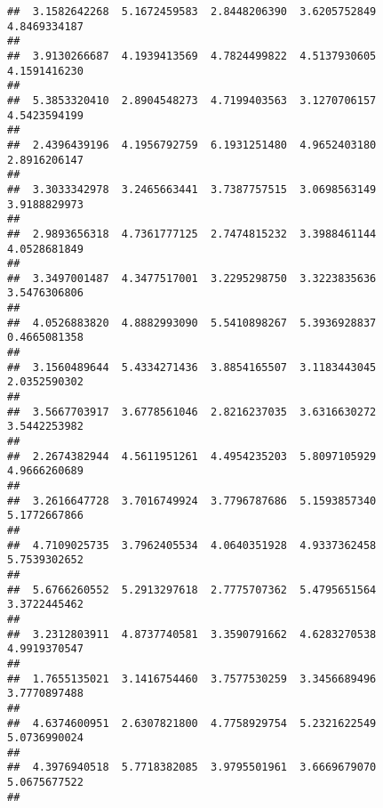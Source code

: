 \documentclass[]{article}
\begin{document}
\begin{verbatim}
##  3.1582642268  5.1672459583  2.8448206390  3.6205752849  4.8469334187 
##                                                                       
##  3.9130266687  4.1939413569  4.7824499822  4.5137930605  4.1591416230 
##                                                                       
##  5.3853320410  2.8904548273  4.7199403563  3.1270706157  4.5423594199 
##                                                                       
##  2.4396439196  4.1956792759  6.1931251480  4.9652403180  2.8916206147 
##                                                                       
##  3.3033342978  3.2465663441  3.7387757515  3.0698563149  3.9188829973 
##                                                                       
##  2.9893656318  4.7361777125  2.7474815232  3.3988461144  4.0528681849 
##                                                                       
##  3.3497001487  4.3477517001  3.2295298750  3.3223835636  3.5476306806 
##                                                                       
##  4.0526883820  4.8882993090  5.5410898267  5.3936928837  0.4665081358 
##                                                                       
##  3.1560489644  5.4334271436  3.8854165507  3.1183443045  2.0352590302 
##                                                                       
##  3.5667703917  3.6778561046  2.8216237035  3.6316630272  3.5442253982 
##                                                                       
##  2.2674382944  4.5611951261  4.4954235203  5.8097105929  4.9666260689 
##                                                                       
##  3.2616647728  3.7016749924  3.7796787686  5.1593857340  5.1772667866 
##                                                                       
##  4.7109025735  3.7962405534  4.0640351928  4.9337362458  5.7539302652 
##                                                                       
##  5.6766260552  5.2913297618  2.7775707362  5.4795651564  3.3722445462 
##                                                                       
##  3.2312803911  4.8737740581  3.3590791662  4.6283270538  4.9919370547 
##                                                                       
##  1.7655135021  3.1416754460  3.7577530259  3.3456689496  3.7770897488 
##                                                                       
##  4.6374600951  2.6307821800  4.7758929754  5.2321622549  5.0736990024 
##                                                                       
##  4.3976940518  5.7718382085  3.9795501961  3.6669679070  5.0675677522 
##                                                                       

\end{verbatim}
\end{document}
